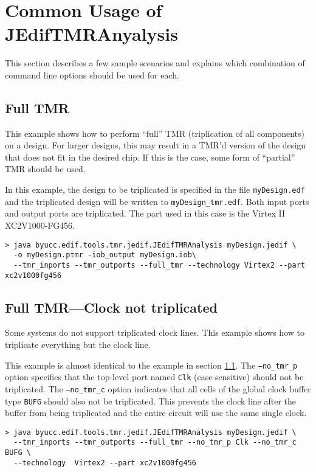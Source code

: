 \section{Common Usage of JEdifTMRAnyalysis}
This section describes a few sample scenarios and explains which combination of
command line options should be used for each.

\subsection{Full TMR}
\label{subsec:fulltmr}
This example shows how to perform ``full'' TMR (triplication of all components) 
on a design. For larger designs, this may result in a TMR'd version of the 
design that does not fit in the desired chip. If this is the case, some form of 
``partial'' TMR should be used.

In this example, the design to be triplicated is specified in the file 
\texttt{myDesign.edf} and the triplicated design will be written to 
\texttt{myDesign\_tmr.edf}. Both input ports and output ports are triplicated. 
The part used in this case is the Virtex II XC2V1000-FG456.

\begin{verbatim}
> java byucc.edif.tools.tmr.jedif.JEdifTMRAnalysis myDesign.jedif \
  -o myDesign.ptmr -iob_output myDesign.iob\
  --tmr_inports --tmr_outports --full_tmr --technology Virtex2 --part xc2v1000fg456
\end{verbatim}


\subsection{Full TMR---Clock not triplicated}
Some systems do not support triplicated clock lines. This example shows how to 
triplicate everything but the clock line.

This example is almost identical to the example in section 
\ref{subsec:fulltmr}. The \texttt{--no\_tmr\_p} option specifies that the 
top-level port named \texttt{Clk} (case-sensitive) should not be triplicated. 
The \texttt{--no\_tmr\_c} option indicates that all cells of the global clock 
buffer type \texttt{BUFG} should also not be triplicated. This prevents the 
clock line after the buffer from being triplicated and the entire circuit will 
use the same single clock.

\begin{verbatim}
> java byucc.edif.tools.tmr.jedif.JEdifTMRAnalysis myDesign.jedif \
  --tmr_inports --tmr_outports --full_tmr --no_tmr_p Clk --no_tmr_c BUFG \
  --technology  Virtex2 --part xc2v1000fg456
\end{verbatim}


